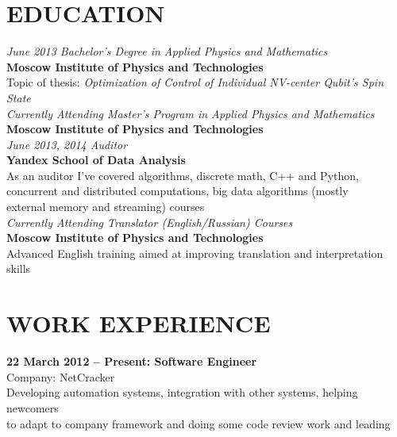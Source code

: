 \documentclass[margin,12pt]{res}
\begin{document}
  \address{28a Pervomayskaya Street, Dolgoprudny, Russian Federation\\
    kremsnx@gmail.com\\
    valery.ovchinnikov@phystech.edu\\
    +7 (985) 9-64-8-512}

\begin{resume}
\section{EDUCATION} 
\textit{June 2013 Bachelor's Degree in Applied Physics and Mathematics\\}
\textbf{Moscow Institute of Physics and Technologies}\\
Topic of thesis: \textit{Optimization of Control of Individual NV-center Qubit's Spin State}\\
\newline
\textit{Currently Attending Master's Program in Applied Physics and Mathematics\\}
\textbf{Moscow Institute of Physics and Technologies}\\
\newline
\textit{June 2013, 2014 Auditor\\}
\textbf{Yandex School of Data Analysis}\\
As an auditor I've covered algorithms, discrete math, C++ and Python,\\
 concurrent and distributed computations, big data algorithms (mostly\\
 external memory and streaming) courses\\
\newline
\textit{Currently Attending Translator (English/Russian) Courses\\}
\textbf{Moscow Institute of Physics and Technologies}\\
Advanced English training aimed at improving translation and
interpretation skills
\section{WORK EXPERIENCE} 
\textbf{22 March 2012 -- Present: Software Engineer}\\
Company: NetCracker\\
Developing automation systems, integration with other systems, helping newcomers\\
 to adapt to company framework and doing some code review work and leading

\end{resume}
\end{document}
